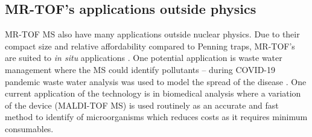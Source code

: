 \subsection{MR-TOF's applications outside physics}
MR-TOF MS also have many applications outside nuclear physics.
Due to their compact size and relative affordability compared to Penning traps, MR-TOF's are suited to \emph{in situ} applications \cite{dickel_multiple-reflection_2013}.
One potential application is waste water management where the MS could identify pollutants \cite{dickel_multiple-reflection_2013} – during COVID-19 pandemic waste water analysis was used to model the spread of the disease \cite{noauthor_wastewater_nodate}.
One current application of the technology is in biomedical analysis where a variation of the device (MALDI-TOF MS) is used routinely as an accurate and fast method to identify of microorganisms which reduces costs as it requires minimum consumables. \cite{noauthor_uk_2019}